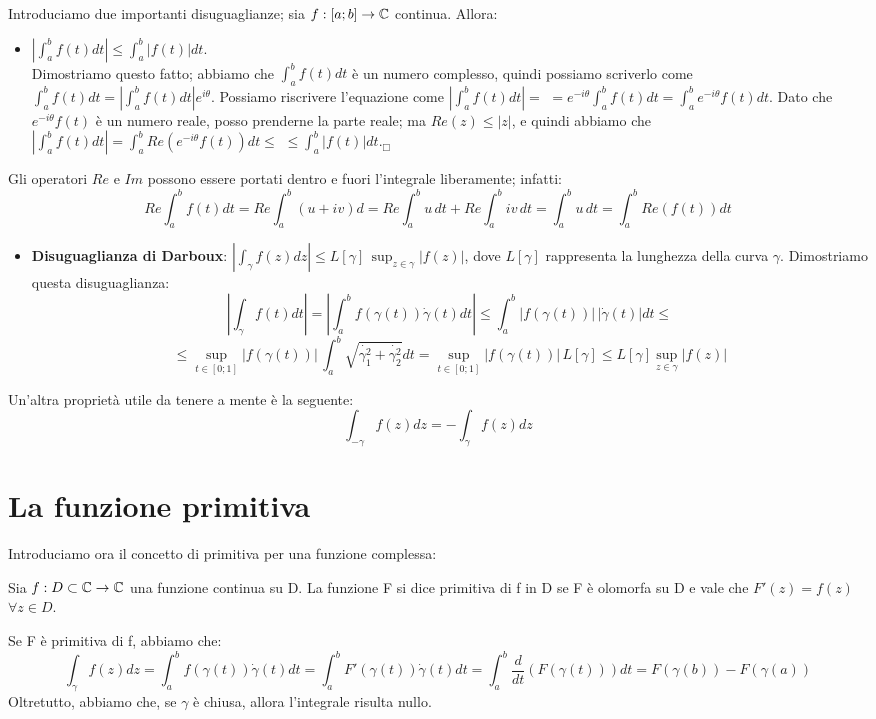 Introduciamo due importanti disuguaglianze; sia $f:[a;b]\to\mathbb{C}$ continua. Allora:
\begin{itemize}
\item $\left|\int_a^b f(t)dt\right|\leq\int_a^b \left|f(t)\right| dt$. \\ Dimostriamo questo fatto; abbiamo che $\int_a^b f(t)dt$ è un numero complesso, quindi possiamo scriverlo come $\int_a^b f(t)dt=\left|\int_a^b f(t)dt\right|e^{i\theta}$. Possiamo riscrivere l'equazione come $\left|\int_a^b f(t)dt\right|=$ $=e^{-i\theta}\int_a^b f(t)dt=\int_a^b e^{-i\theta} f(t)dt$. Dato che $e^{-i\theta}f(t)$ è un numero reale, posso prenderne la parte reale; ma $Re(z)\leq |z|$, e quindi abbiamo che $\left|\int_a^b f(t)dt\right|=\int_a^b Re(e^{-i\theta} f(t))dt\leq$  $\leq \int_a^b |f(t)|dt$.$_{\Box}$ 
\end{itemize}

\begin{osservazione}
Gli operatori $Re$ e $Im$ possono essere portati dentro e fuori l'integrale liberamente; infatti:
$$Re \int_a^b f(t)dt=Re \int_a^b(u+iv)d=Re \int_a^bu \, dt +Re \int_a^b iv \, dt =\int_a^bu \, dt=\int_a^b Re(f(t))dt$$
\end{osservazione}

\begin{itemize}
\item \textbf{Disuguaglianza di Darboux}: $\left|\int_{\gamma} f(z) dz\right| \leq L[\gamma] \, \sup_{z \in \gamma} |f(z)|$, dove $L[\gamma]$ rappresenta la lunghezza della curva $\gamma$. Dimostriamo questa disuguaglianza: 
$$\left|\int_{\gamma} f(t) dt\right|=\left|\int_a ^b f(\gamma(t))\dot{\gamma}(t)dt\right| \leq \int_a ^b |f(\gamma(t))| \, |\dot{\gamma}(t)|dt \leq$$
$$\leq \sup_{t \in [0;1]} |f(\gamma(t))|\, \int_a ^b \sqrt{\dot{\gamma_1 ^2}+\dot{\gamma_2 ^2}}dt=\sup_{t \in [0;1]} |f(\gamma(t))| \, L[\gamma] \leq L[\gamma] \sup_{z \in \gamma} |f(z)|$$
\end{itemize}
Un'altra proprietà utile da tenere a mente è la seguente:
$$\int_{-\gamma} f(z) dz=-\int_{\gamma} f(z) dz$$

\section{La funzione primitiva}

Introduciamo ora il concetto di primitiva per una funzione complessa:
\begin{definizione}
Sia $f:D \subset \mathbb{C} \to \mathbb{C}$ una funzione continua su D. La funzione F si dice primitiva di f in D se F è olomorfa su D e vale che $F'(z)=f(z)$ $\forall z \in D$.
\end{definizione}
Se F è primitiva di f, abbiamo che:
$$\int_{\gamma}f(z)dz=\int_a ^b f(\gamma(t))\dot{\gamma}(t)dt=\int_a ^b F'(\gamma(t))\dot{\gamma}(t)dt=\int_a ^b \frac{d}{dt}(F(\gamma(t)))dt=F(\gamma(b))-F(\gamma(a))$$ Oltretutto, abbiamo che, se $\gamma$ è chiusa, allora l'integrale risulta nullo.

